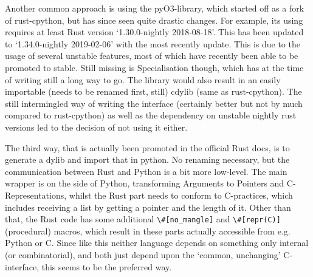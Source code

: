 Another common approach is using the pyO3-library, which started off as a fork of rust-cpython, but has since seen quite drastic changes. For example, its using requires at least Rust version ‘1.30.0-nightly 2018-08-18’. 
This has been updated to ‘1.34.0-nightly 2019-02-06’ with the most recently update. This is due to the usage of several unstable features, most of which have recently been able to be promoted to stable. Still missing is Specialisation though, which has at the time of writing still a long way to go. The library would also result in an easily importable (needs to be renamed first, still) cdylib (same as rust-cpython). The still intermingled way of writing the interface (certainly better but not by much compared to rust-cpython) as well as the dependency on unstable nightly rust versions led to the decision of not using it either.

The third way, that is actually been promoted in the official Rust docs, is to
generate a dylib and import that in python. No renaming necessary, but the
communication between Rust and Python is a bit more low-level. The main wrapper
is on the side of Python, transforming Arguments to Pointers and
C-Representations, whilst the Rust part needs to conform to C-practices, which
includes receiving a list by getting a pointer and the length of it. Other than
that, the Rust code has some additional \verb!\#[no_mangle]! and \verb!\#[repr(C)]!
(procedural) macros, which result in these parts actually accessible from e.g.
Python or C. Since like this neither language depends on something only
internal (or combinatorial), and both just depend upon the ‘common, unchanging’
C-interface, this seems to be the preferred way.





